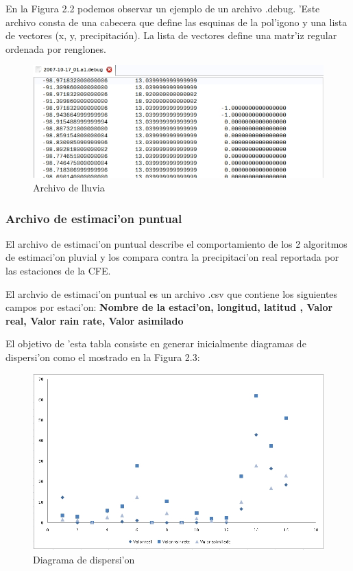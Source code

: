En la Figura 2.2 podemos observar un ejemplo de un archivo .debug. 'Este archivo
consta de una cabecera que define las esquinas de la pol'igono y una lista de vectores (x, y, precipitación). La
lista de vectores define una matr'iz regular ordenada por renglones.

\begin{figure}[h!]
 \centering
 \includegraphics[width=170mm,bb=0 0 677 262]{./imagenes/archivodebug.jpg}
 \caption{Archivo de lluvia}
\end{figure}

\subsubsection*{Archivo de estimaci'on puntual}
El archivo de estimaci'on puntual describe el comportamiento de los 2 algoritmos de estimaci'on pluvial y los compara
contra la precipitaci'on real reportada por las estaciones de la CFE.

El archvio de estimaci'on puntual es un archivo .csv que contiene los siguientes campos por estaci'on: 
\textbf{Nombre de la estaci'on, longitud, latitud , Valor real, Valor rain rate, Valor asimilado}

El objetivo de 'esta tabla consiste en generar inicialmente diagramas de dispersi'on como el mostrado en la Figura 2.3:

\begin{figure}[h!]
 \centering
 \includegraphics[width=170mm,bb=0 0 837 507]{./imagenes/archivoErrorAnalysis.jpg}
 \caption{Diagrama de dispersi'on}
\end{figure}

